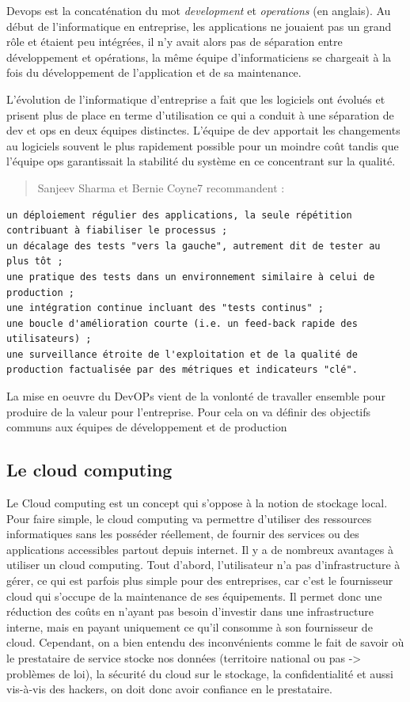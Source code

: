 \documentclass[]{article}
\begin{document}
Devops est la concaténation du mot \emph{development} et
\emph{operations} (en anglais). Au début de l'informatique en
entreprise, les applications ne jouaient pas un grand rôle et étaient
peu intégrées, il n'y avait alors pas de séparation entre développement
et opérations, la même équipe d'informaticiens se chargeait à la fois du
développement de l'application et de sa maintenance.

L'évolution de l'informatique d'entreprise a fait que les logiciels ont
évolués et prisent plus de place en terme d'utilisation ce qui a conduit
à une séparation de dev et ops en deux équipes distinctes. L'équipe de
dev apportait les changements au logiciels souvent le plus rapidement
possible pour un moindre coût tandis que l'équipe ops garantissait la
stabilité du système en ce concentrant sur la qualité.

\begin{quote}
Sanjeev Sharma et Bernie Coyne7 recommandent :
\end{quote}

\begin{verbatim}
un déploiement régulier des applications, la seule répétition contribuant à fiabiliser le processus ;
un décalage des tests "vers la gauche", autrement dit de tester au plus tôt ;
une pratique des tests dans un environnement similaire à celui de production ;
une intégration continue incluant des "tests continus" ;
une boucle d'amélioration courte (i.e. un feed-back rapide des utilisateurs) ;
une surveillance étroite de l'exploitation et de la qualité de production factualisée par des métriques et indicateurs "clé".
\end{verbatim}

La mise en oeuvre du DevOPs vient de la vonlonté de travaller ensemble
pour produire de la valeur pour l'entreprise. Pour cela on va définir
des objectifs communs aux équipes de développement et de production

\subsection{Le cloud computing}\label{le-cloud-computing}

Le Cloud computing est un concept qui s'oppose à la notion de stockage
local. Pour faire simple, le cloud computing va permettre d'utiliser des
ressources informatiques sans les posséder réellement, de fournir des
services ou des applications accessibles partout depuis internet. Il y a
de nombreux avantages à utiliser un cloud computing. Tout d'abord,
l'utilisateur n'a pas d'infrastructure à gérer, ce qui est parfois plus
simple pour des entreprises, car c'est le fournisseur cloud qui s'occupe
de la maintenance de ses équipements. Il permet donc une réduction des
coûts en n'ayant pas besoin d'investir dans une infrastructure interne,
mais en payant uniquement ce qu'il consomme à son fournisseur de cloud.
Cependant, on a bien entendu des inconvénients comme le fait de savoir
où le prestataire de service stocke nos données (territoire national ou
pas -\textgreater{} problèmes de loi), la sécurité du cloud sur le
stockage, la confidentialité et aussi vis-à-vis des hackers, on doit
donc avoir confiance en le prestataire.
\end{document}
